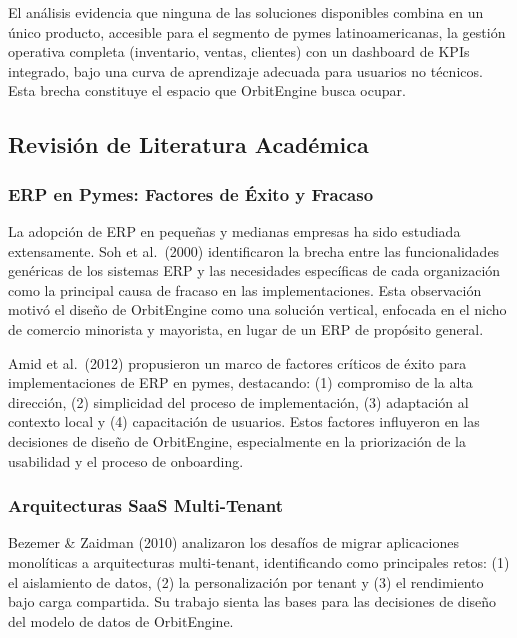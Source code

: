 El análisis evidencia que ninguna de las soluciones disponibles combina en un único producto, accesible para el segmento de pymes latinoamericanas, la gestión operativa completa (inventario, ventas, clientes) con un dashboard de KPIs integrado, bajo una curva de aprendizaje adecuada para usuarios no técnicos. Esta brecha constituye el espacio que OrbitEngine busca ocupar.

\subsection{Revisión de Literatura Académica}\label{revisiuxf3n-de-literatura-acaduxe9mica}

\subsubsection{ERP en Pymes: Factores de Éxito y Fracaso}\label{erp-en-pymes-factores-de-uxe9xito-y-fracaso}

La adopción de ERP en pequeñas y medianas empresas ha sido estudiada extensamente. Soh et al.~(2000) identificaron la brecha entre las funcionalidades genéricas de los sistemas ERP y las necesidades específicas de cada organización como la principal causa de fracaso en las implementaciones. Esta observación motivó el diseño de OrbitEngine como una solución vertical, enfocada en el nicho de comercio minorista y mayorista, en lugar de un ERP de propósito general.

Amid et al.~(2012) propusieron un marco de factores críticos de éxito para implementaciones de ERP en pymes, destacando: (1) compromiso de la alta dirección, (2) simplicidad del proceso de implementación, (3) adaptación al contexto local y (4) capacitación de usuarios. Estos factores influyeron en las decisiones de diseño de OrbitEngine, especialmente en la priorización de la usabilidad y el proceso de onboarding.

\subsubsection{Arquitecturas SaaS Multi-Tenant}\label{arquitecturas-saas-multi-tenant}

Bezemer \& Zaidman (2010) analizaron los desafíos de migrar aplicaciones monolíticas a arquitecturas multi-tenant, identificando como principales retos: (1) el aislamiento de datos, (2) la personalización por tenant y (3) el rendimiento bajo carga compartida. Su trabajo sienta las bases para las decisiones de diseño del modelo de datos de OrbitEngine.

